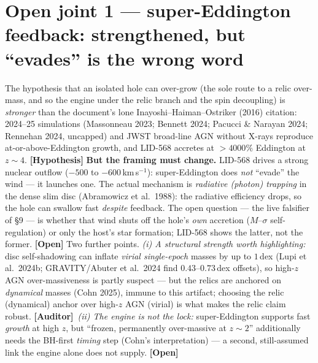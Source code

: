 \documentclass[11pt]{article}
\newcommand{\Hyp}{\textbf{\textcolor{blue!55!black}{[Hypothesis]}}}
\newcommand{\Open}{\textbf{\textcolor{gray!10!black}{[Open]}}}
\newcommand{\Auditor}{\textbf{\textcolor{teal!55!black}{[Auditor]}}}
\begin{document}
\section{Open joint 1 --- super-Eddington feedback: strengthened, but ``evades'' is the wrong word}
The hypothesis that an isolated hole can over-grow (the sole route to a relic over-mass, and so the engine under the relic branch and the spin decoupling) is \emph{stronger} than the document's lone Inayoshi--Haiman--Ostriker (2016) citation: 2024--25 simulations (Massonneau 2023; Bennett 2024; Pacucci \& Narayan 2024; Rennehan 2024, uncapped) and JWST broad-line AGN without X-rays reproduce at-or-above-Eddington growth, and LID-568 accretes at $>4000\%$ Eddington at $z\sim4$. \Hyp
\textbf{But the framing must change.} LID-568 drives a strong nuclear outflow ($-500$ to $-600$\,km\,s$^{-1}$): super-Eddington does \emph{not} ``evade'' the wind --- it launches one. The actual mechanism is \emph{radiative (photon) trapping} in the dense slim disc (Abramowicz et al.\ 1988): the radiative efficiency drops, so the hole can swallow fast \emph{despite} feedback. The open question --- the live falsifier of \S9 --- is whether that wind shuts off the hole's \emph{own} accretion ($M$--$\sigma$ self-regulation) or only the host's star formation; LID-568 shows the latter, not the former. \Open
Two further points. \emph{(i) A structural strength worth highlighting:} disc self-shadowing can inflate \emph{virial single-epoch} masses by up to $1$\,dex (Lupi et al.\ 2024b; GRAVITY/Abuter et al.\ 2024 find $0.43$--$0.73$\,dex offsets), so high-$z$ AGN over-massiveness is partly suspect --- but the relics are anchored on \emph{dynamical} masses (Cohn 2025), immune to this artifact; choosing the relic (dynamical) anchor over high-$z$ AGN (virial) is what makes the relic claim robust. \Auditor\ \emph{(ii) The engine is not the lock:} super-Eddington supports fast \emph{growth} at high $z$, but ``frozen, permanently over-massive at $z\sim2$'' additionally needs the BH-first \emph{timing} step (Cohn's interpretation) --- a second, still-assumed link the engine alone does not supply. \Open
\end{document}

